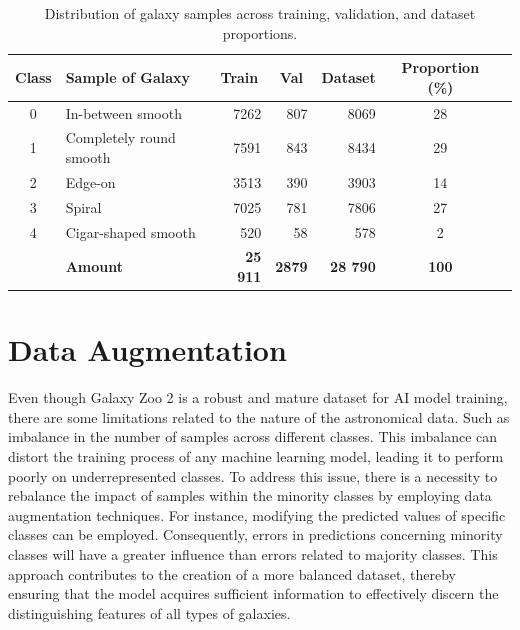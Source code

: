 \begin{table}[hbt]
\centering
\renewcommand{\arraystretch}{1.2}
\begin{tabular}{@{}clrrrcr@{}}
\toprule
Class & Sample of Galaxy       & \multicolumn{1}{c}{Train} & \multicolumn{1}{c}{Val} & \multicolumn{1}{c}{Dataset} & \multicolumn{1}{c}{Proportion (\%)} \\ \midrule
0     & In-between smooth      & 7262                      & 807                      & 8069                          & 28                                    \\
1     & Completely round smooth & 7591                      & 843                      & 8434                          & 29                                    \\
2     & Edge-on                & 3513                      & 390                      & 3903                          & 14                                    \\
3     & Spiral                 & 7025                      & 781                      & 7806                          & 27                                    \\
4     & Cigar-shaped smooth    & 520                       & 58                       & 578                           & 2                                     \\ \midrule
      & \textbf{Amount}        & \textbf{25 911}           & \textbf{2879}            & \textbf{28 790}               & \textbf{100}                          \\ \bottomrule
\end{tabular}
\caption{Distribution of galaxy samples across training, validation, and dataset proportions.}
\label{tab:galaxy_samples}
\end{table}

\section{Data Augmentation}
\label{sec:03-data-augmentaiton}

Even though Galaxy Zoo 2 is a robust and mature dataset for AI model training, there are some limitations related to the nature of the astronomical data. Such as imbalance in the number of samples across different classes. This imbalance can distort the training process of any machine learning model, leading it to perform poorly on underrepresented classes. To address this issue, there is a necessity to rebalance the impact of samples within the minority classes by employing data augmentation techniques. For instance, modifying the predicted values of specific classes can be employed. Consequently, errors in predictions concerning minority classes will have a greater influence than errors related to majority classes. This approach contributes to the creation of a more balanced dataset, thereby ensuring that the model acquires sufficient information to effectively discern the distinguishing features of all types of galaxies.

